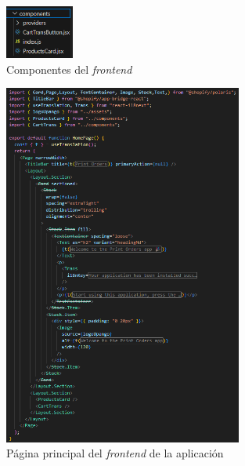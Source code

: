 \documentclass[11pt]{article}
\begin{document}
\begin{figure}[H]
    \centering
    \includegraphics[width=0.2\textwidth]{imagenes-admin/componentes-admin.png}
    \caption{\label{fig:componentes} Componentes del \textit{frontend} }
    \vspace{\fill}
\end{figure}



\begin{figure}[H]
    \centering
    \includegraphics[width=0.7\textwidth]{imagenes-admin/paginaHome.png}
    \caption{\label{fig:homepage} Página principal del \textit{frontend} de la aplicación }
    \vspace{\fill}
\end{figure}
\end{document}
